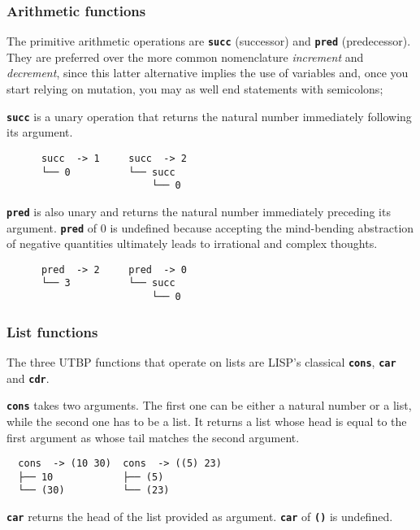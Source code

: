 \documentclass[12pt,twocolumn]{article}
\begin{document}
\subsubsection{Arithmetic functions}\label{subsubsection_arithmetic_functions}
The primitive arithmetic operations are \texttt{\textbf{succ}} (successor) and \texttt{\textbf{pred}} (predecessor). They are preferred over the more common nomenclature \emph{increment} and \emph{decrement}, since this latter alternative implies the use of variables and, once you start relying on mutation, you may as well end statements with semicolons;

\texttt{\textbf{succ}} is a unary operation that returns the natural number immediately following its argument.

\begin{verbatim}
      succ  -> 1     succ  -> 2
      └── 0          └── succ     
                         └── 0
\end{verbatim}

\texttt{\textbf{pred}} is also unary and returns the natural number immediately preceding its argument. \texttt{\textbf{pred}} of 0 is undefined because accepting the mind-bending abstraction of negative quantities ultimately leads to irrational and complex thoughts.

\begin{verbatim}
      pred  -> 2     pred  -> 0     
      └── 3          └── succ       
                         └── 0      
\end{verbatim}

\subsubsection{List functions}
The three UTBP functions that operate on lists are LISP's classical \texttt{\textbf{cons}}, \texttt{\textbf{car}} and \texttt{\textbf{cdr}}. 

\texttt{\textbf{cons}} takes two arguments. The first one can be either a natural number or a list, while the second one has to be a list. It returns a list whose head is equal to the first argument as whose tail matches the second argument.

\begin{verbatim}
  cons  -> (10 30)  cons  -> ((5) 23)     
  ├── 10            ├── (5)
  └── (30)          └── (23)
\end{verbatim}

\texttt{\textbf{car}} returns the head of the list provided as argument. \texttt{\textbf{car}} of \texttt{\textbf{()}} is undefined.
\end{document}
